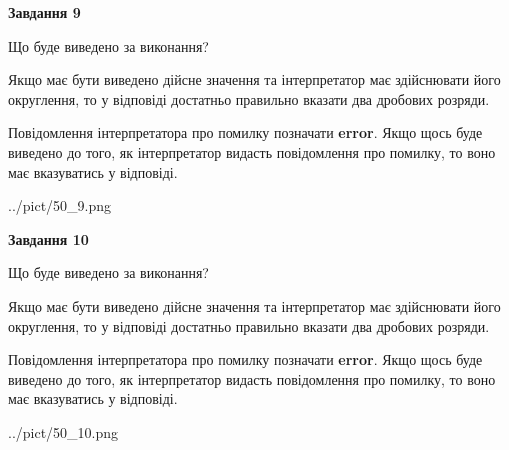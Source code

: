 \documentclass[12pt, ukrainian]{article}
\begin{document}
{\begin {Large}
{\begin {center}\textbf{Завдання 9}\end {center}}\par
Що буде виведено за виконання? \par

Якщо має бути виведено дійсне значення та інтерпретатор має здійснювати його округлення, 
то у відповіді достатньо правильно вказати два дробових розряди.

Повідомлення інтерпретатора про помилку позначати \textbf{error}.
Якщо щось буде виведено до того, як інтерпретатор видасть повідомлення про помилку, 
то воно має вказуватись у відповіді. \par

\begin{center}
	{../pict/50_9.png}
\end{center}
\newpage

{\begin {center}\textbf{Завдання 10}\end {center}}\par
Що буде виведено за виконання? \par

Якщо має бути виведено дійсне значення та інтерпретатор має здійснювати його округлення, 
то у відповіді достатньо правильно вказати два дробових розряди.

Повідомлення інтерпретатора про помилку позначати \textbf{error}.
Якщо щось буде виведено до того, як інтерпретатор видасть повідомлення про помилку, 
то воно має вказуватись у відповіді. \par

\begin{center}
	{../pict/50_10.png}
\end{center}
\newpage

\end {Large}}
\end{document}
